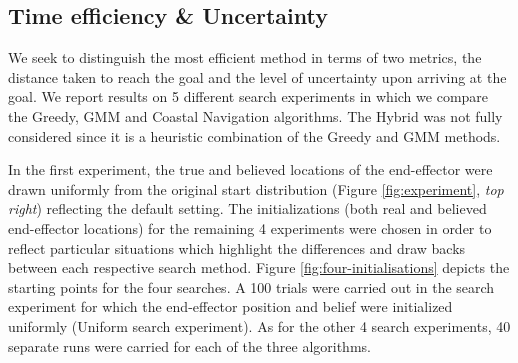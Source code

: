 \subsection{Time efficiency \& Uncertainty}\label{sub:time_uncertainty}

We seek to distinguish the most efficient method in terms of two metrics, the distance taken to reach the goal
and the level of uncertainty upon arriving at the goal. We report results on 5 different search 
experiments in which we compare the Greedy, GMM and Coastal Navigation algorithms. The Hybrid was not fully considered since it 
is a heuristic combination of the Greedy and GMM methods. 


In the first experiment, the true and believed locations of the end-effector 
were drawn uniformly from the original start distribution (Figure \ref{fig:experiment}, \textit{top right}) 
reflecting the default setting. The initializations (both real and believed end-effector locations) for the remaining 4 experiments
were chosen in order to reflect particular situations which highlight the differences and draw backs between each respective search 
method. Figure \ref{fig:four-initialisations} depicts the starting points for the four searches. 
A 100 trials were carried out in the search experiment for which the end-effector position and belief were initialized uniformly 
(Uniform search experiment). As for the other 4 search experiments, 40 separate runs were carried for each of the three algorithms.



